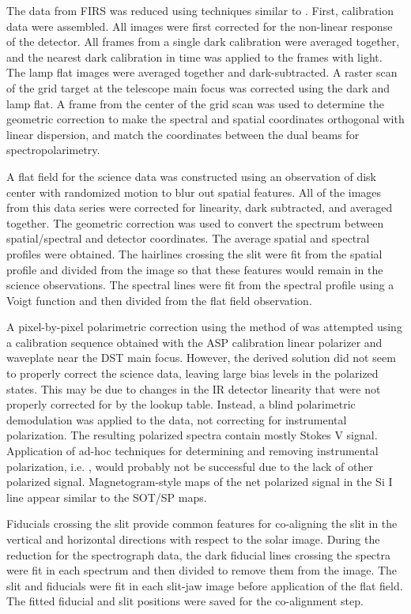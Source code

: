 \documentclass[twocolumn]{aastex62}
\begin{document}
The data from FIRS was reduced using techniques similar to \citet{2012Jaegglietal}.  First, calibration data were assembled.  All images were first corrected for the non-linear response of the detector.  All frames from a single dark calibration were averaged together, and the nearest dark calibration in time was applied to the frames with light.  The lamp flat images were averaged together and dark-subtracted.  A raster scan of the grid target at the telescope main focus was corrected using the dark and lamp flat.  A frame from the center of the grid scan was used to determine the geometric correction to make the spectral and spatial coordinates orthogonal with linear dispersion, and match the coordinates between the dual beams for spectropolarimetry.

A flat field for the science data was constructed using an observation of disk center with randomized motion to blur out spatial features.  All of the images from this data series were corrected for linearity, dark subtracted, and averaged together.  The geometric correction was used to convert the spectrum between spatial/spectral and detector coordinates.  The average spatial and spectral profiles were obtained.  The hairlines crossing the slit were fit from the spatial profile and divided from the image so that these features would remain in the science observations.  The spectral lines were fit from the spectral profile using a Voigt function and then divided from the flat field observation.

A pixel-by-pixel polarimetric correction using the method of \cite{2013Schad} was attempted using a calibration sequence obtained with the ASP calibration linear polarizer and waveplate near the DST main focus.  However, the derived solution did not seem to properly correct the science data, leaving large bias levels in the polarized states.  This may be due to changes in the IR detector linearity that were not properly corrected for by the lookup table.  Instead, a blind polarimetric demodulation was applied to the data, not correcting for instrumental polarization.  The resulting polarized spectra contain mostly Stokes V signal.  Application of ad-hoc techniques for determining and removing instrumental polarization, i.e. \citet{collados03}, would probably not be successful due to the lack of other polarized signal.  Magnetogram-style maps of the net polarized signal in the Si I line appear similar to the SOT/SP maps.

Fiducials crossing the slit provide common features for co-aligning the slit in the vertical and horizontal directions with respect to the solar image.  During the reduction for the spectrograph data, the dark fiducial lines crossing the spectra were fit in each spectrum and then divided to remove them from the image.  The slit and fiducials were fit in each slit-jaw image before application of the flat field.  The fitted fiducial and slit positions were saved for the co-alignment step.
\end{document}
